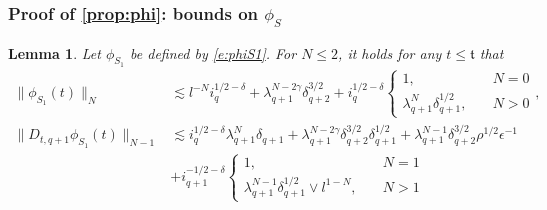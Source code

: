 \documentclass[10pt,a4paper]{amsart}
\numberwithin{equation}{section}
\numberwithin{corollario}{section}
\newtheorem{lemma}{Lemma}
\numberwithin{lemma}{section}
\numberwithin{prop}{section}
\theoremstyle{definition}
\theoremstyle{remark}
\newcommand{\qq}{_{q+1}}
\newcommand{\qqq}{_{q+2}}
\begin{document}
\subsubsection{Proof of \autoref{prop:phi}: bounds on $\phi_S$}
\begin{lemma}\label{lemma:phiS1}
Let $\phi_{S_1}$ be defined by \eqref{e:phiS1}. For $N\le 2$, it holds for any $t\le \mathfrak{t}$ that
    \begin{align}
    \label{est:phiS1}
    \|\phi_{S_1}(t)\|_N
    &\lesssim 
    l^{-N}i_q^{1/2-\delta}+\lambda\qq^{N-2\gamma}\delta\qqq^{3/2}+i_q^{1/2-\delta}\begin{cases}
        1,\quad &N=0\\
        \lambda\qq^N\delta\qq^{1/2},\quad &N>0
    \end{cases},\\
    \label{e:DtphiS1}
    \|D_{t,q+1}\phi_{S_1}(t)\|_{N-1}
    &\lesssim i_q^{1/2-\delta}\lambda\qq^N\delta\qq+\lambda\qq^{N-2\gamma}\delta\qqq^{3/2}\delta\qq^{1/2}+\lambda\qq^{N-1}\delta\qqq^{3/2}\rho^{1/2}\epsilon^{-1}\\
     &+i\qq^{-1/2-\delta}\begin{cases}
        1,\quad &N=1\\
        \lambda\qq^{N-1}\delta\qq^{1/2}\vee l^{1-N},\quad &N>1
    \end{cases}
    \end{align}   
\end{lemma}
\end{document}
